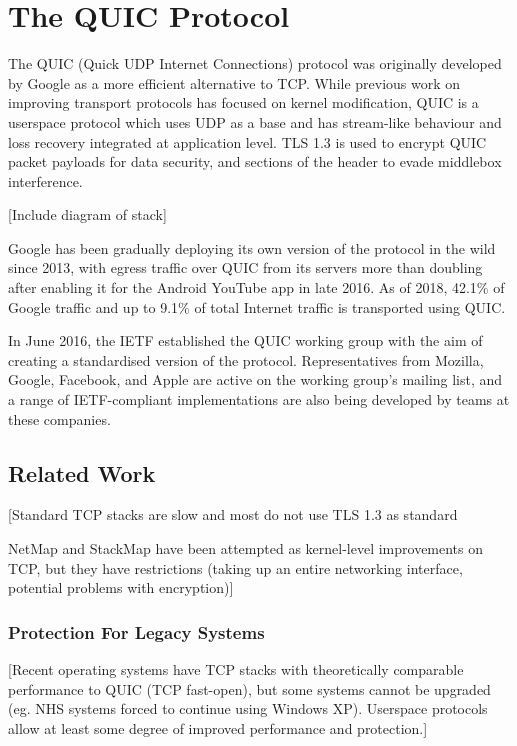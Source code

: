 \documentclass{l4proj}
\begin{document}
\chapter{The QUIC Protocol}

The QUIC (Quick UDP Internet Connections) protocol was originally developed by Google as a more efficient alternative to TCP. While previous work on improving transport protocols has focused on kernel modification, QUIC is a userspace protocol which uses UDP as a base and has stream-like behaviour and loss recovery integrated at application level. TLS 1.3 is used to encrypt QUIC packet payloads for data security, and sections of the header to evade middlebox interference.

[Include diagram of stack]

Google has been gradually deploying its own version of the protocol in the wild since 2013, with egress traffic over QUIC from its servers more than doubling after enabling it for the Android YouTube app in late 2016.\cite{gquic-development} As of 2018, 42.1\% of Google traffic and up to 9.1\% of total Internet traffic is transported using QUIC.\cite{quic-traffic-2018}

In June 2016, the IETF established the QUIC working group with the aim of creating a standardised version of the protocol. Representatives from Mozilla, Google, Facebook, and Apple are active on the working group's mailing list, and a range of IETF-compliant implementations are also being developed by teams at these companies.\cite{quic-implementations}

\section{Related Work}
[Standard TCP stacks are slow and most do not use TLS 1.3 as standard

NetMap and StackMap have been attempted as kernel-level improvements on TCP, but they have restrictions (taking up an entire networking interface, potential problems with encryption)]

\subsection{Protection For Legacy Systems}
[Recent operating systems have TCP stacks with theoretically comparable performance to QUIC (TCP fast-open), but some systems cannot be upgraded (eg. NHS systems forced to continue using Windows XP). Userspace protocols allow at least some degree of improved performance and protection.]
\end{document}
